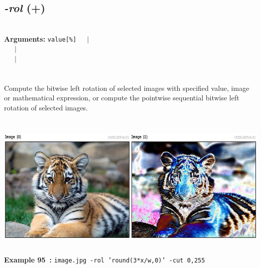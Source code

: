 \documentclass[a4paper,11pt,twoside]{book}
\begin{document}
\subsection{\emph{-rol} (+)}\vspace*{-0.5em}
~\\\textbf{Arguments: } 
{\small \texttt{value[\%]}}~~~$|$\\
\hspace*{2.2cm}{\small \texttt{[image]}}~~~$|$\\
~~~$|$\\
\\~\\
Compute the bitwise left rotation of selected images with specified value, image or
mathematical expression, or compute the pointwise sequential bitwise left rotation of
selected images.
\begin{center}\includegraphics[keepaspectratio=true,height=7cm,width=\textwidth]{img/gmic_def95.jpg}\\
{\footnotesize \textbf{Example 95~:} \texttt{image.jpg -rol 'round(3*x/w,0)' -cut 0,255}}
\end{center}
\end{document}
